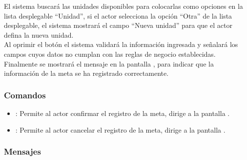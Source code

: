   El sistema buscará las unidades disponibles para colocarlas como opciones en la lista desplegable ``Unidad'', si el actor selecciona la opción ``Otra'' de la lista desplegable, el sistema mostrará
  el campo ``Nueva unidad'' para que el actor defina la nueva unidad.\\
  
  Al oprimir el botón  el sistema validará la información ingresada y señalará los campos cuyos datos no cumplan con las reglas de negocio establecidas.\\
  
  Finalmente se mostrará el mensaje  en la pantalla , para indicar que la información de la
  meta se ha registrado correctamente.
    
\subsubsection{Comandos}
\begin{itemize}
	\item {}: Permite al actor confirmar el registro de la meta, dirige a la pantalla .
	\item {}: Permite al actor cancelar el registro de la meta, dirige a la pantalla .
\end{itemize}


\subsubsection{Mensajes}

